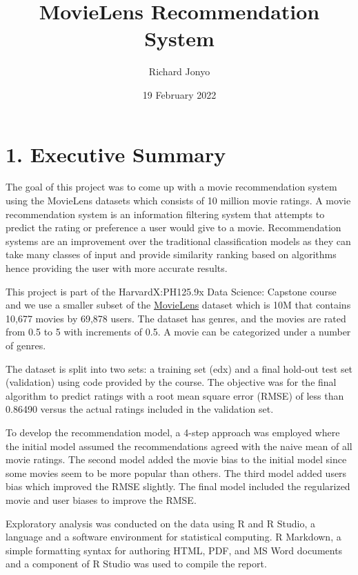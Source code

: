 \documentclass[
]{article}
\title{MovieLens Recommendation System}
\author{Richard Jonyo}
\date{19 February 2022}
\begin{document}
\maketitle

\hypertarget{executive-summary}{%
\section{1. Executive Summary}\label{executive-summary}}

The goal of this project was to come up with a movie recommendation
system using the MovieLens datasets which consists of 10 million movie
ratings. A movie recommendation system is an information filtering
system that attempts to predict the rating or preference a user would
give to a movie. Recommendation systems are an improvement over the
traditional classification models as they can take many classes of input
and provide similarity ranking based on algorithms hence providing the
user with more accurate results.

This project is part of the HarvardX:PH125.9x Data Science: Capstone
course and we use a smaller subset of the
\href{https://grouplens.org/datasets/movielens/10m/}{MovieLens} dataset
which is 10M that contains 10,677 movies by 69,878 users. The dataset
has genres, and the movies are rated from 0.5 to 5 with increments of
0.5. A movie can be categorized under a number of genres.

The dataset is split into two sets: a training set (edx) and a final
hold-out test set (validation) using code provided by the course. The
objective was for the final algorithm to predict ratings with a root
mean square error (RMSE) of less than 0.86490 versus the actual ratings
included in the validation set.

To develop the recommendation model, a 4-step approach was employed
where the initial model assumed the recommendations agreed with the
naive mean of all movie ratings. The second model added the movie bias
to the initial model since some movies seem to be more popular than
others. The third model added users bias which improved the RMSE
slightly. The final model included the regularized movie and user biases
to improve the RMSE.

Exploratory analysis was conducted on the data using R and R Studio, a
language and a software environment for statistical computing. R
Markdown, a simple formatting syntax for authoring HTML, PDF, and MS
Word documents and a component of R Studio was used to compile the
report.
\end{document}
